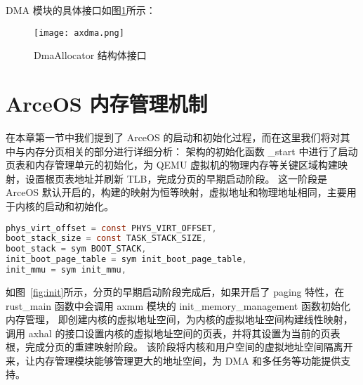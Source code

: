 DMA 模块的具体接口如图\ref{fig:DmaAllocator}所示：
\begin{figure}[H]
    \centering
    \texttt{[image: axdma.png]}
    \caption{DmaAllocator 结构体接口}
    \label{fig:DmaAllocator}
\end{figure}

\section{ArceOS 内存管理机制}



在本章第一节中我们提到了 ArceOS 的启动和初始化过程，而在这里我们将对其中与内存分页相关的部分进行详细分析：
架构的初始化函数 \_start 中进行了启动页表和内存管理单元的初始化，为 QEMU 虚拟机的物理内存等关键区域构建映射，设置根页表地址并刷新 TLB，完成分页的早期启动阶段。
这一阶段是 ArceOS 默认开启的，构建的映射为恒等映射，虚拟地址和物理地址相同，主要用于内核的启动和初始化。
\begin{lstlisting}[language=c, caption=\_start]
phys_virt_offset = const PHYS_VIRT_OFFSET,
boot_stack_size = const TASK_STACK_SIZE,
boot_stack = sym BOOT_STACK,
init_boot_page_table = sym init_boot_page_table,
init_mmu = sym init_mmu,
\end{lstlisting}

如图~\ref{fig:init}所示，分页的早期启动阶段完成后，如果开启了 paging 特性，在 rust\_main 函数中会调用 axmm 模块的 init\_memory\_management 函数初始化内存管理，
即创建内核的虚拟地址空间，为内核的虚拟地址空间构建线性映射，调用 axhal 的接口设置内核的虚拟地址空间的页表，并将其设置为当前的页表根，完成分页的重建映射阶段。
该阶段将内核和用户空间的虚拟地址空间隔离开来，让内存管理模块能够管理更大的地址空间，为 DMA 和多任务等功能提供支持。

